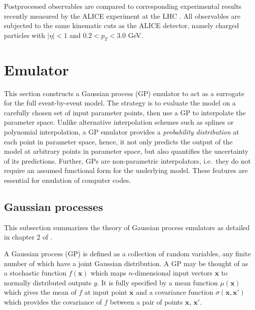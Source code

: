 \documentclass[aps,prc,reprint,amsmath]{revtex4-1}
\begin{document}
Postprocessed observables are compared to corresponding experimental results recently measured by the ALICE experiment at the LHC \cite{Abelev:2014mda}.
All observables are subjected to the same kinematic cuts as the ALICE detector, namely charged particles with $|\eta| < 1$ and $0.2 < p_T < 3.0$ GeV.


\section{Emulator}

This section constructs a Gaussian process (GP) emulator to act as a surrogate for the full event-by-event model.
The strategy is to evaluate the model on a carefully chosen set of input parameter points, then use a GP to interpolate the parameter space.
Unlike alternative interpolation schemes such as splines or polynomial interpolation, a GP emulator provides a \emph{probability distribution} at each point in parameter space, hence, it not only predicts the output of the model at arbitrary points in parameter space, but also quantifies the uncertainty of its predictions.
Further, GPs are non-parametric interpolators, i.e.\ they do not require an assumed functional form for the underlying model.
These features are essential for emulation of computer codes.

\subsection{Gaussian processes}

\newcommand{\x}{\mathbf x}
\newcommand{\y}{\mathbf y}
\newcommand{\zero}{\mathbf 0}
\newcommand{\muvec}{\boldsymbol\mu}
\newcommand{\N}{\mathcal N}

This subsection summarizes the theory of Gaussian process emulators as detailed in chapter 2 of \cite{Rasmussen:2006gp}.

A Gaussian process (GP) is defined as a collection of random variables, any finite number of which have a joint Gaussian distribution.
A GP may be thought of as a stochastic function $f(\x)$ which maps $n$-dimensional input vectors $\x$ to normally distributed outputs $y$.
It is fully specified by a mean function $\mu(\x)$ which gives the mean of $f$ at input point $\x$ and a covariance function $\sigma(\x, \x')$ which provides the covariance of $f$ between a pair of points $\x$, $\x'$.
\end{document}
